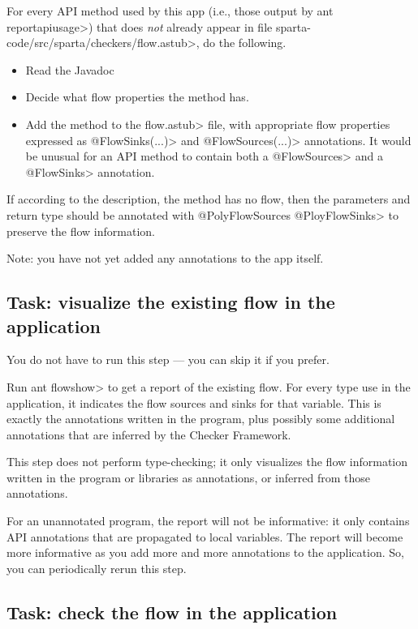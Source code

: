 For every API method used by this app (i.e., those output by \<ant
reportapiusage>) that does \emph{not} already appear in file
\<sparta-code/src/sparta/checkers/flow.astub>, do the following.
\begin{itemize}
\item
Read the Javadoc
\item
Decide what flow properties the method has.
\item
Add the method to the \<flow.astub> file, with
appropriate flow properties expressed as \<@FlowSinks(...)> and
\<@FlowSources(...)> annotations.
It would be unusual for an API method to contain both a \<@FlowSources>
and a \<@FlowSinks> annotation.
\end{itemize}

If according to the description, the method has no flow, then the parameters and return type
 should be annotated with \<@PolyFlowSources @PloyFlowSinks>
  to preserve the flow information.


Note: you have not yet added any annotations to the app itself.


\subsection{Task: visualize the existing flow in the application}

You do not have to run this step --- you can skip it if you
prefer.

Run \<ant flowshow> to get a report of the
existing flow.
For every type use in the application, it indicates the flow sources
and sinks for that variable. This is exactly the annotations written
in the program, plus possibly some additional annotations that are
inferred by the Checker Framework.


This step does not perform type-checking; it only visualizes the flow
information written in the program or libraries as annotations, or
inferred from those annotations.


For an unannotated program, the report will not be informative: it
only contains API annotations that are propagated to local
variables. The report will become more informative as you add more and
more annotations to the application. So, you can periodically rerun
this step. 


\subsection{Task: check the flow in the application}

